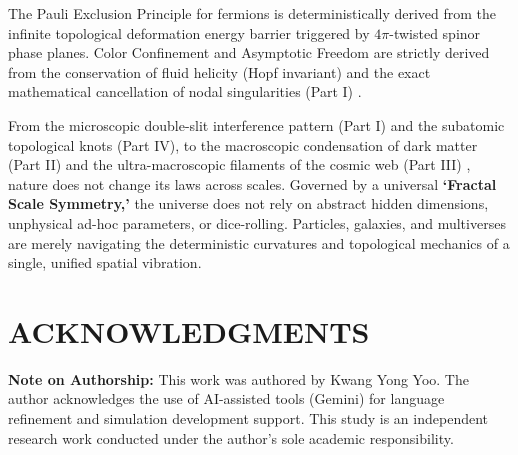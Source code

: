 \documentclass[reprint,amsmath,amssymb,aps,prd]{revtex4-2}
\begin{document}
The Pauli Exclusion Principle for fermions is deterministically derived from the infinite topological deformation energy barrier triggered by $4\pi$-twisted spinor phase planes. Color Confinement and Asymptotic Freedom are strictly derived from the conservation of fluid helicity (Hopf invariant) \cite{Moffatt1969} and the exact mathematical cancellation of nodal singularities (Part I) \cite{YooPart1, Gross1973}.

From the microscopic double-slit interference pattern (Part I) and the subatomic topological knots (Part IV), to the macroscopic condensation of dark matter (Part II) \cite{YooPart2} and the ultra-macroscopic filaments of the cosmic web (Part III) \cite{YooPart3}, nature does not change its laws across scales. Governed by a universal \textbf{`Fractal Scale Symmetry,'} the universe does not rely on abstract hidden dimensions, unphysical ad-hoc parameters, or dice-rolling. Particles, galaxies, and multiverses are merely navigating the deterministic curvatures and topological mechanics of a single, unified spatial vibration.

\vspace{1em}
\section*{ACKNOWLEDGMENTS}
\textbf{Note on Authorship:} This work was authored by Kwang Yong Yoo. The author acknowledges the use of AI-assisted tools (Gemini) for language refinement and simulation development support. This study is an independent research work conducted under the author's sole academic responsibility.
\end{document}
